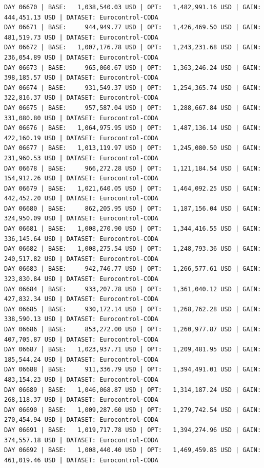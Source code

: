 \documentclass[11pt,a4paper]{article}
\begin{document}
\begin{verbatim}
DAY 06670 | BASE:   1,038,540.03 USD | OPT:   1,482,991.16 USD | GAIN: 444,451.13 USD | DATASET: Eurocontrol-CODA
DAY 06671 | BASE:     944,949.77 USD | OPT:   1,426,469.50 USD | GAIN: 481,519.73 USD | DATASET: Eurocontrol-CODA
DAY 06672 | BASE:   1,007,176.78 USD | OPT:   1,243,231.68 USD | GAIN: 236,054.89 USD | DATASET: Eurocontrol-CODA
DAY 06673 | BASE:     965,060.67 USD | OPT:   1,363,246.24 USD | GAIN: 398,185.57 USD | DATASET: Eurocontrol-CODA
DAY 06674 | BASE:     931,549.37 USD | OPT:   1,254,365.74 USD | GAIN: 322,816.37 USD | DATASET: Eurocontrol-CODA
DAY 06675 | BASE:     957,587.04 USD | OPT:   1,288,667.84 USD | GAIN: 331,080.80 USD | DATASET: Eurocontrol-CODA
DAY 06676 | BASE:   1,064,975.95 USD | OPT:   1,487,136.14 USD | GAIN: 422,160.19 USD | DATASET: Eurocontrol-CODA
DAY 06677 | BASE:   1,013,119.97 USD | OPT:   1,245,080.50 USD | GAIN: 231,960.53 USD | DATASET: Eurocontrol-CODA
DAY 06678 | BASE:     966,272.28 USD | OPT:   1,121,184.54 USD | GAIN: 154,912.26 USD | DATASET: Eurocontrol-CODA
DAY 06679 | BASE:   1,021,640.05 USD | OPT:   1,464,092.25 USD | GAIN: 442,452.20 USD | DATASET: Eurocontrol-CODA
DAY 06680 | BASE:     862,205.95 USD | OPT:   1,187,156.04 USD | GAIN: 324,950.09 USD | DATASET: Eurocontrol-CODA
DAY 06681 | BASE:   1,008,270.90 USD | OPT:   1,344,416.55 USD | GAIN: 336,145.64 USD | DATASET: Eurocontrol-CODA
DAY 06682 | BASE:   1,008,275.54 USD | OPT:   1,248,793.36 USD | GAIN: 240,517.82 USD | DATASET: Eurocontrol-CODA
DAY 06683 | BASE:     942,746.77 USD | OPT:   1,266,577.61 USD | GAIN: 323,830.84 USD | DATASET: Eurocontrol-CODA
DAY 06684 | BASE:     933,207.78 USD | OPT:   1,361,040.12 USD | GAIN: 427,832.34 USD | DATASET: Eurocontrol-CODA
DAY 06685 | BASE:     930,172.14 USD | OPT:   1,268,762.28 USD | GAIN: 338,590.13 USD | DATASET: Eurocontrol-CODA
DAY 06686 | BASE:     853,272.00 USD | OPT:   1,260,977.87 USD | GAIN: 407,705.87 USD | DATASET: Eurocontrol-CODA
DAY 06687 | BASE:   1,023,937.71 USD | OPT:   1,209,481.95 USD | GAIN: 185,544.24 USD | DATASET: Eurocontrol-CODA
DAY 06688 | BASE:     911,336.79 USD | OPT:   1,394,491.01 USD | GAIN: 483,154.23 USD | DATASET: Eurocontrol-CODA
DAY 06689 | BASE:   1,046,068.87 USD | OPT:   1,314,187.24 USD | GAIN: 268,118.37 USD | DATASET: Eurocontrol-CODA
DAY 06690 | BASE:   1,009,287.60 USD | OPT:   1,279,742.54 USD | GAIN: 270,454.94 USD | DATASET: Eurocontrol-CODA
DAY 06691 | BASE:   1,019,717.78 USD | OPT:   1,394,274.96 USD | GAIN: 374,557.18 USD | DATASET: Eurocontrol-CODA
DAY 06692 | BASE:   1,008,440.40 USD | OPT:   1,469,459.85 USD | GAIN: 461,019.46 USD | DATASET: Eurocontrol-CODA

\end{verbatim}
\end{document}
